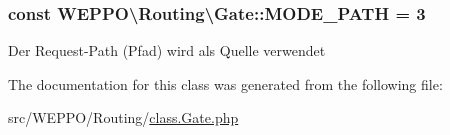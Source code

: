 \subsubsection[{\texorpdfstring{M\+O\+D\+E\+\_\+\+P\+A\+TH}{MODE_PATH}}]{\setlength{\rightskip}{0pt plus 5cm}const W\+E\+P\+P\+O\textbackslash{}\+Routing\textbackslash{}\+Gate\+::\+M\+O\+D\+E\+\_\+\+P\+A\+TH = 3}\hypertarget{classWEPPO_1_1Routing_1_1Gate_abc68289168d1451768d390fad7435e75}{}\label{classWEPPO_1_1Routing_1_1Gate_abc68289168d1451768d390fad7435e75}
Der Request-\/\+Path (Pfad) wird als Quelle verwendet 

The documentation for this class was generated from the following file\+:\begin{DoxyCompactItemize}
\item 
src/\+W\+E\+P\+P\+O/\+Routing/\hyperlink{class_8Gate_8php}{class.\+Gate.\+php}\end{DoxyCompactItemize}
